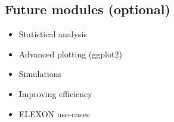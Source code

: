 \documentclass[]{article}
\providecommand{\tightlist}{%
  \setlength{\itemsep}{0pt}\setlength{\parskip}{0pt}}
\begin{document}
\subsection{Future modules (optional)}\label{future-modules-optional}

\begin{itemize}
\tightlist
\item
  Statistical analysis
\item
  Advanced plotting (ggplot2)
\item
  Simulations
\item
  Improving efficiency
\item
  ELEXON use-cases
\end{itemize}
\end{document}
